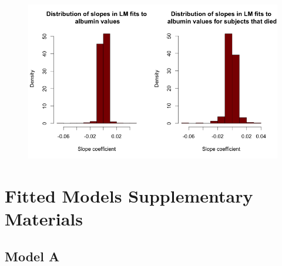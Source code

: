 \documentclass[paper=a4, fontsize=11pt]{scrartcl} %
\numberwithin{equation}{section} %
\numberwithin{figure}{section} %
\numberwithin{table}{section} %
\begin{document}
\begin{figure}[H]
\centering
\includegraphics[width=.8\textwidth]{plots/slopes_hist.png}
\label{fig:slopes_hist}
\end{figure}



\section{Fitted Models Supplementary Materials}

\subsection{Model A}
\end{document}
